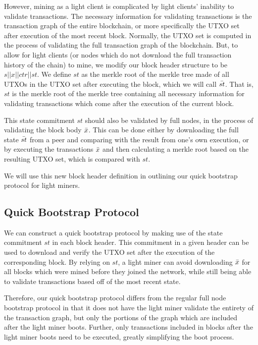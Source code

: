 However, mining as a light client is complicated by light clients' inability to validate transactions. The necessary information for validating transactions is the transaction graph of the entire blockchain, or more specifically the UTXO set after execution of the most recent block. Normally, the UTXO set is computed in the process of validating the full transaction graph of the blockchain. But, to allow for light clients (or nodes which do not download the full transaction history of the chain) to mine, we modify our block header structure to be $s || x || ctr || st$. We define $st$ as the merkle root of the merkle tree made of all UTXOs in the UTXO set after executing the block, which we will call $\Bar{st}$. That is, $st$ is the merkle root of the merkle tree containing all necessary information for validating transactions which come after the execution of the current block.

This state commitment $st$ should also be validated by full nodes, in the process of validating the block body $\Bar{x}$. This can be done either by downloading the full state $\Bar{st}$ from a peer and comparing with the result from one's own execution, or by executing the transactions $\Bar{x}$ and then calculating a merkle root based on the resulting UTXO set, which is compared with $st$.

We will use this new block header definition in outlining our quick bootstrap protocol for light miners.

\subsection{Quick Bootstrap Protocol}
We can construct a quick bootstrap protocol by making use of the state commitment $st$ in each block header. This commitment in a given header can be used to download and verify the UTXO set after the execution of the corresponding block. By relying on $st$, a light miner can avoid downloading $\Bar{x}$ for all blocks which were mined before they joined the network, while still being able to validate transactions based off of the most recent state.

Therefore, our quick bootstrap protocol differs from the regular full node bootstrap protocol in that it does not have the light miner validate the entirety of the transaction graph, but only the portions of the graph which are included after the light miner boots. Further, only transactions included in blocks after the light miner boots need to be executed, greatly simplifying the boot process.

